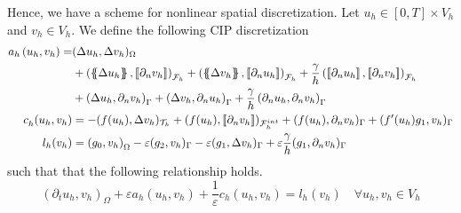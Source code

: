 Hence, we have a scheme for nonlinear spatial discretization. Let $u_{h} \in \left[ 0,T \right] \times V_{h}  $ and $v_{h} \in V_{h}$. We define the following CIP discretization
\begin{equation}
    \label{eq:cip_ch}
    \begin{split}
        a_{h} \left( u_{h}, v_{h} \right)   =& ( \Delta  u_{h}, \Delta v_{h} ) _{ \Omega } \\
                                     & + \left( \mean{  \Delta  u_{h} }, \jump{ \partial _{n }v_{h}} \right)_{\mathcal{F}_{h}  }  + \left( \mean{ \Delta  v_{h} }, \jump{ \partial _{n}u_{h} }      \right)_{\mathcal{F}_{h}  }  + \frac{\gamma }{h}
                                     \left( \jump{ \partial _{n} u_{h}}, \jump{ \partial _{n} v_{h}   }   \right)_{\mathcal{F}_{h} } \\
                                     & + \left(   \Delta  u_{h} ,  \partial _{n }v_{h} \right)_{\Gamma   }  + \left(  \Delta  v_{h} ,  \partial _{n}u_{h}       \right)_{\Gamma  }  + \frac{\gamma }{h}  \left(  \partial _{n} u_{h},  \partial _{n} v_{h}      \right)_{ \Gamma } \\
    c^{}_{h} ( u_{h},v_{h})  & = -( f( u_{h}), \Delta v_{h} )_{\mathcal{T} _{h}}+  ( f( u_{h}) , \jump{ \partial _{n}v_{h} }  )_{\mathcal{F} _{h}^{int}} + ( f(u_{h}), \partial _{n} v_{h})_{\Gamma  }  + ( f'( u_{h})  g_{1}   ,  v_{h})_{\Gamma } \\
    l_{h}( v_{h}) & =  \left( g_{0}, v_{h} \right) _{\Omega } -  \varepsilon ( g_{2},  v_{h} )_{\Gamma }  -  \varepsilon ( g_{1}, \Delta  v_{h}  )_{\Gamma }  + \varepsilon \frac{\gamma }{h} ( g_{1}, \partial _{n} v_{h}  )_{\Gamma }
    \end{split}
\end{equation}
such that that the following relationship holds.
\[
    ( \partial _{t}u_{h}, v_{h})_\Omega + \varepsilon  a_{h}( u_{h},v_{h}) + \frac{1}{\varepsilon }c_{h}( u_{h},v_{h})   =  l_{h}(v_{h}) \quad  \forall u_{h}, v_{h} \in V_{h}
\]


